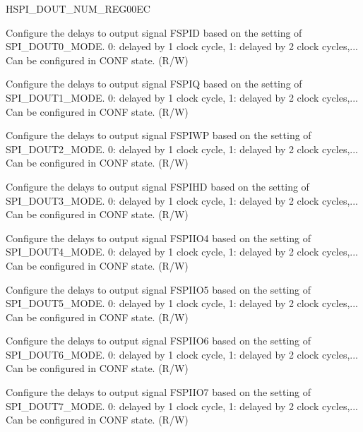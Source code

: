 \begin{register}{H}{SPI\_DOUT\_NUM\_REG}{\hexprefix{}00EC}\label{regdesc:SPIDOUTNUMREG}
%
%
%
%
%
%
%
%
%
\regnewline%
\begin{regdesc}\begin{reglist}
\label{fielddesc:SPIDOUT0NUM}\item [SPI\_DOUT0\_NUM] Configure the delays to output signal FSPID based on the setting of SPI\_DOUT0\_MODE. 0: delayed by 1 clock cycle, 1: delayed by 2 clock cycles,...  Can be configured in CONF state. (R/W)
\label{fielddesc:SPIDOUT1NUM}\item [SPI\_DOUT1\_NUM] Configure the delays to output signal FSPIQ based on the setting of SPI\_DOUT1\_MODE. 0: delayed by 1 clock cycle, 1: delayed by 2 clock cycles,...  Can be configured in CONF state. (R/W)
\label{fielddesc:SPIDOUT2NUM}\item [SPI\_DOUT2\_NUM] Configure the delays to output signal FSPIWP based on the setting of SPI\_DOUT2\_MODE. 0: delayed by 1 clock cycle, 1: delayed by 2 clock cycles,...  Can be configured in CONF state. (R/W)
\label{fielddesc:SPIDOUT3NUM}\item [SPI\_DOUT3\_NUM] Configure the delays to output signal FSPIHD based on the setting of SPI\_DOUT3\_MODE. 0: delayed by 1 clock cycle, 1: delayed by 2 clock cycles,...  Can be configured in CONF state. (R/W)
\label{fielddesc:SPIDOUT4NUM}\item [SPI\_DOUT4\_NUM] Configure the delays to output signal FSPIIO4 based on the setting of SPI\_DOUT4\_MODE. 0: delayed by 1 clock cycle, 1: delayed by 2 clock cycles,...  Can be configured in CONF state. (R/W)
\label{fielddesc:SPIDOUT5NUM}\item [SPI\_DOUT5\_NUM] Configure the delays to output signal FSPIIO5 based on the setting of SPI\_DOUT5\_MODE. 0: delayed by 1 clock cycle, 1: delayed by 2 clock cycles,...  Can be configured in CONF state. (R/W)
\label{fielddesc:SPIDOUT6NUM}\item [SPI\_DOUT6\_NUM] Configure the delays to output signal FSPIIO6 based on the setting of SPI\_DOUT6\_MODE. 0: delayed by 1 clock cycle, 1: delayed by 2 clock cycles,...  Can be configured in CONF state. (R/W)
\label{fielddesc:SPIDOUT7NUM}\item [SPI\_DOUT7\_NUM] Configure the delays to output signal FSPIIO7 based on the setting of SPI\_DOUT7\_MODE. 0: delayed by 1 clock cycle, 1: delayed by 2 clock cycles,...  Can be configured in CONF state. (R/W)
\end{reglist}\end{regdesc}
\end{register}


